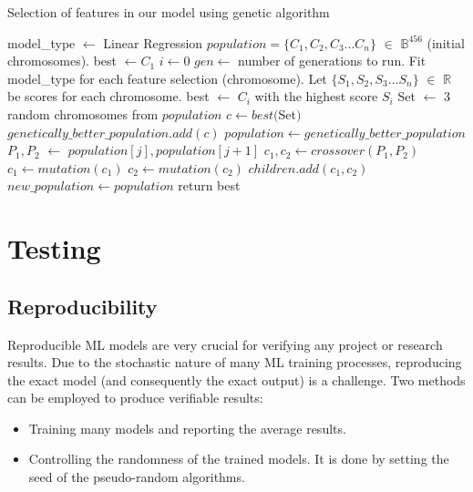 \documentclass[11pt]{article}
\begin{document}
\label{Genetic_Algo}
\begin{algorithm}
\caption{Selection of features in our model using genetic algorithm \cite{genetic_algorithm}}
\begin{algorithmic}[1]
\State model\_type $\gets$ Linear Regression
\State $ population = \{C_1, C_2, C_3... C_n\}$ $\in$ $\mathbb{B}^{456}$ (initial chromosomes).
\State best $\gets C_1$ 
\State $i \gets 0$
\State $gen \gets$ number of generations to run.
          \State Fit model\_type for each feature selection (chromosome). 
          \State Let $\{S_1, S_2, S_3... S_n\}$ $\in$ $\mathbb{R}$ be scores for each chromosome.
          \State best $\gets$ $C_i$ with the highest score $S_i$
              \State Set $\gets$ 3 random chromosomes from $population$
              \State $c \gets best($Set$)$
              \State $genetically\_better\_population.add(c)$
          \EndFor
          \State $population \gets genetically\_better\_population$
              \State $P_1, P_2$ $\gets$ $population[j], population[j+1]$
              \State $c_1, c_2 \gets crossover(P_1, P_2)$
              \State $c_1 \gets mutation(c_1)$
              \State $c_2 \gets mutation(c_2)$
              \State $children.add(c_1, c_2)$
          \EndFor
      \State $new\_population \gets population$
      \EndFor
\State return best
\EndProcedure
\end{algorithmic}
\end{algorithm}

\section{Testing}
\subsection{Reproducibility}
Reproducible ML models are very crucial for verifying any project or research results. Due to the stochastic nature of many ML training processes, reproducing the exact model (and consequently the exact output) is a challenge. Two methods can be employed to produce verifiable results:
\begin{itemize}
\item Training many models and reporting the average results.
\item Controlling the randomness of the trained models. It is done by setting the seed of the pseudo-random algorithms.
\end{itemize}
\end{document}

